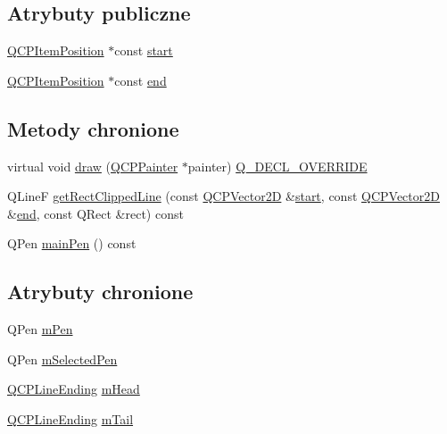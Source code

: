 \subsection*{Atrybuty publiczne}
\begin{DoxyCompactItemize}
\item 
\hyperlink{class_q_c_p_item_position}{Q\+C\+P\+Item\+Position} $\ast$const \hyperlink{class_q_c_p_item_line_a602da607a09498b0f152ada1d6851bc5}{start}
\item 
\hyperlink{class_q_c_p_item_position}{Q\+C\+P\+Item\+Position} $\ast$const \hyperlink{class_q_c_p_item_line_a15598864c1c22a2497a1979c4980c4e1}{end}
\end{DoxyCompactItemize}
\subsection*{Metody chronione}
\begin{DoxyCompactItemize}
\item 
virtual void \hyperlink{class_q_c_p_item_line_ae184140b61b2ef5b8edde76304447200}{draw} (\hyperlink{class_q_c_p_painter}{Q\+C\+P\+Painter} $\ast$painter) \hyperlink{qcustomplot_8hh_a42cc5eaeb25b85f8b52d2a4b94c56f55}{Q\+\_\+\+D\+E\+C\+L\+\_\+\+O\+V\+E\+R\+R\+I\+DE}
\item 
Q\+LineF \hyperlink{class_q_c_p_item_line_ad8ea8403df3e11d0beddc44e1227e655}{get\+Rect\+Clipped\+Line} (const \hyperlink{class_q_c_p_vector2_d}{Q\+C\+P\+Vector2D} \&\hyperlink{class_q_c_p_item_line_a602da607a09498b0f152ada1d6851bc5}{start}, const \hyperlink{class_q_c_p_vector2_d}{Q\+C\+P\+Vector2D} \&\hyperlink{class_q_c_p_item_line_a15598864c1c22a2497a1979c4980c4e1}{end}, const Q\+Rect \&rect) const 
\item 
Q\+Pen \hyperlink{class_q_c_p_item_line_a7b5bc4ebacb55774b87c91b308ca7912}{main\+Pen} () const 
\end{DoxyCompactItemize}
\subsection*{Atrybuty chronione}
\begin{DoxyCompactItemize}
\item 
Q\+Pen \hyperlink{class_q_c_p_item_line_abbb544d5bb927dfe4e81a7f3ca4c65ac}{m\+Pen}
\item 
Q\+Pen \hyperlink{class_q_c_p_item_line_aff858ad6dde3b90024814ca4b116f278}{m\+Selected\+Pen}
\item 
\hyperlink{class_q_c_p_line_ending}{Q\+C\+P\+Line\+Ending} \hyperlink{class_q_c_p_item_line_a51603f28ab7ddb1c1a95ea384791d3ed}{m\+Head}
\item 
\hyperlink{class_q_c_p_line_ending}{Q\+C\+P\+Line\+Ending} \hyperlink{class_q_c_p_item_line_ab8ed61dfe15bbb1cbf9b95eae95e242f}{m\+Tail}
\end{DoxyCompactItemize}
